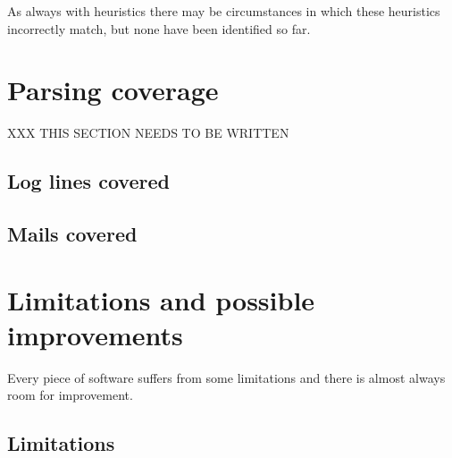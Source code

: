 \documentclass[a4paper,12pt,draft]{article}
\begin{document}
As always with heuristics there may be circumstances in which these
heuristics incorrectly match, but none have been identified so far.

\section{Parsing coverage}

XXX THIS SECTION NEEDS TO BE WRITTEN

\label{parsing-coverage}

\subsection{Log lines covered}

\label{log-lines-covered}

\subsection{Mails covered}

\label{mails-covered}

\section{Limitations and possible improvements}

\label{limitations-improvements}

Every piece of software suffers from some limitations and there is almost
always room for improvement.

\subsection{Limitations}
\end{document}
